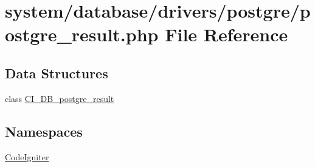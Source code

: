 \hypertarget{postgre__result_8php}{\section{system/database/drivers/postgre/postgre\-\_\-result.php File Reference}
\label{postgre__result_8php}
}
\subsection*{Data Structures}
\begin{DoxyCompactItemize}
\item 
class \hyperlink{class_c_i___d_b__postgre__result}{C\-I\-\_\-\-D\-B\-\_\-postgre\-\_\-result}
\end{DoxyCompactItemize}
\subsection*{Namespaces}
\begin{DoxyCompactItemize}
\item 
\hyperlink{namespace_code_igniter}{Code\-Igniter}
\end{DoxyCompactItemize}
